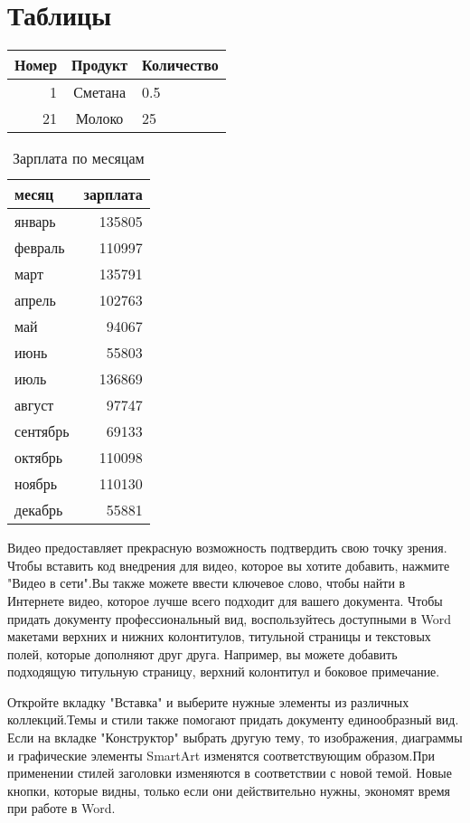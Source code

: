 
\section{Таблицы}


\begin{tabular}{|r||c|l|}
    \hline
    Номер&Продукт&Количество \\[12pt]
    \hline
    1&Сметана&0.5  \\
    21&Молоко&25 \\
    \hline
\end{tabular}	


\begin{table}[t]
    \caption{Зарплата по  месяцам}
    \label{tab:salary}
    \begin{tabular}{l|r}
        месяц    & зарплата \\
        \hline
        январь   & 135805   \\
        февраль  & 110997   \\
        март     & 135791   \\
        апрель   & 102763   \\
        май      & 94067    \\
        июнь     & 55803    \\
        июль     & 136869   \\
        август   & 97747    \\
        сентябрь & 69133    \\
        октябрь  & 110098   \\
        ноябрь   & 110130   \\
        декабрь  & 55881   
    \end{tabular}
\end{table}	


	Видео предоставляет прекрасную возможность подтвердить свою точку зрения. Чтобы вставить код внедрения для видео, которое вы хотите добавить, нажмите "Видео в сети".Вы также можете ввести ключевое слово, чтобы найти в Интернете видео, которое лучше всего подходит для вашего документа. Чтобы придать документу профессиональный вид, воспользуйтесь доступными в Word макетами верхних и нижних колонтитулов, титульной страницы и текстовых полей, которые дополняют друг друга. Например, вы можете добавить подходящую титульную страницу, верхний колонтитул и боковое примечание.

Откройте вкладку "Вставка" и выберите нужные элементы из различных коллекций.Темы и стили также помогают придать документу единообразный вид. Если на вкладке "Конструктор" выбрать другую тему, то изображения, диаграммы и графические элементы SmartArt изменятся соответствующим образом.При применении стилей заголовки изменяются в соответствии с новой темой. Новые кнопки, которые видны, только если они действительно нужны, экономят время при работе в Word.


